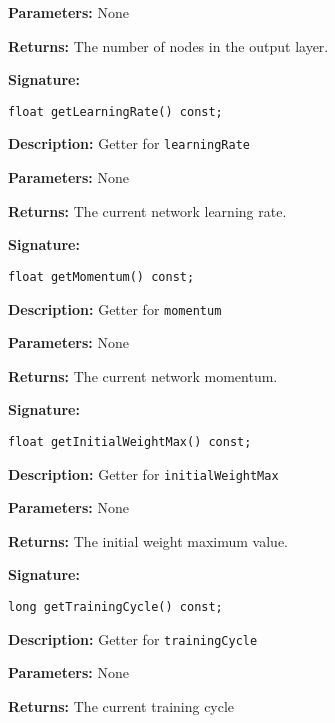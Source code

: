 \documentclass[a4paper]{article}
\begin{document}
\textbf{Parameters: } None

\textbf{Returns: }
The number of nodes in the output layer.

\hrulefill %

\textbf{Signature:} \begin{lstlisting}
float getLearningRate() const;
\end{lstlisting}

\textbf{Description: }
Getter for \lstinline{learningRate}

\textbf{Parameters: } None

\textbf{Returns: }
The current network learning rate.

\hrulefill %
\newpage
\hrulefill

\textbf{Signature:} \begin{lstlisting}
float getMomentum() const;
\end{lstlisting}

\textbf{Description: }
Getter for \lstinline{momentum}

\textbf{Parameters: } None

\textbf{Returns: }
The current network momentum.

\hrulefill %

\textbf{Signature:} \begin{lstlisting}
float getInitialWeightMax() const;
\end{lstlisting}

\textbf{Description: }
Getter for \lstinline{initialWeightMax}

\textbf{Parameters: } None

\textbf{Returns: }
The initial weight maximum value.

\hrulefill %

\textbf{Signature:} \begin{lstlisting}
long getTrainingCycle() const;
\end{lstlisting}

\textbf{Description: }
Getter for \lstinline{trainingCycle}

\textbf{Parameters: } None

\textbf{Returns: }
The current training cycle

\hrulefill %
\end{document}
